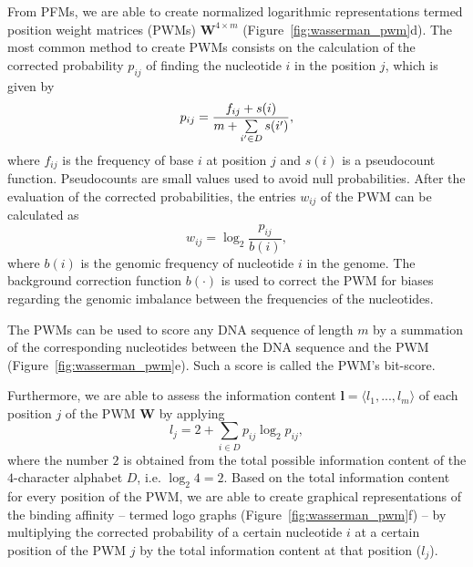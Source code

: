 From PFMs, we are able to create normalized logarithmic representations termed position weight matrices (PWMs) $\mathbf{W}^{4 \times m}$ (Figure~\ref{fig:wasserman_pwm}d). The most common method to create PWMs consists on the calculation of the corrected probability $ p_{ij} $ of finding the nucleotide $ i $ in the position $ j $, which is given by
\begin{equation}
  \label{eq:pwm1}
  p_{ij} = \frac{ f_{ij} + s(i) }{ m + {\sum\limits _{i^\prime \in D}{ \hspace{-0.0cm} s(i^\prime)}} }, 
\end{equation}
where $ f_{ij} $ is the frequency of base $ i $ at position $ j $ and $ s(i) $ is a pseudocount function. Pseudocounts are small values used to avoid null probabilities. After the evaluation of the corrected probabilities, the entries $ w_{ij} $ of the PWM can be calculated as
\begin{equation}
  \label{eq:pwm2}
  w_{ij} = \log_2 \frac{ p_{ij} }{ b(i) }, 
\end{equation}
where $ b(i) $ is the genomic frequency of nucleotide $ i $ in the genome. The background correction function $b(\cdot)$ is used to correct the PWM for biases regarding the genomic imbalance between the frequencies of the nucleotides.

The PWMs can be used to score any DNA sequence of length $m$ by a summation of the corresponding nucleotides between the DNA sequence and the PWM (Figure~\ref{fig:wasserman_pwm}e). Such a score is called the PWM's bit-score.

Furthermore, we are able to assess the information content $ \mathbf{l} = \langle{l}_{1}, ..., {l}_{m}\rangle $ of each position $ j $ of the PWM $ \mathbf{W} $ by applying
\begin{equation}
  \label{eq:pwm.ic}
  {l}_{j} = 2 + \sum\limits _{i \in D} p_{ij} \log_{2} p_{ij},
\end{equation}
where the number $2$ is obtained from the total possible information content of the $4$-character alphabet $D$, i.e. $\log_{2}4 = 2$. Based on the total information content for every position of the PWM, we are able to create graphical representations of the binding affinity -- termed logo graphs (Figure~\ref{fig:wasserman_pwm}f) -- by multiplying the corrected probability of a certain nucleotide $i$ at a certain position of the PWM $j$ by the total information content at that position (${l}_{j}$).

